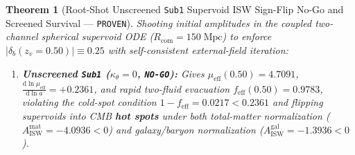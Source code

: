 \documentclass[11pt,a4paper]{article}
\newtheorem{theorem}{Theorem}
\begin{document}
\begin{theorem}[Root-Shot Unscreened \textnormal{{\upshape\texttt{Sub1}}} Supervoid ISW Sign-Flip No-Go and Screened Survival --- \textnormal{{\upshape\texttt{PROVEN}}}]
\label{thm:isw-nogo}
Shooting initial amplitudes in the coupled two-channel spherical supervoid ODE ($R_{\mathrm{com}} = 150\;\mathrm{Mpc}$) to enforce $|\delta_b(z_v = 0.50)| \equiv 0.25$ with self-consistent external-field iteration:
\begin{enumerate}
  \item \textbf{Unscreened {\upshape\texttt{Sub1}} ($\kappa_\theta = 0$, {\upshape\texttt{NO-GO}}):} Gives $\mu_{\mathrm{eff}}(0.50) = 4.7091$, $\frac{\mathrm{d}\ln\mu_{\mathrm{eff}}}{\mathrm{d}\ln a} = +0.2361$, and rapid two-fluid evacuation $f_{\mathrm{eff}}(0.50) = 0.9783$, violating the cold-spot condition $1 - f_{\mathrm{eff}} = 0.0217 < 0.2361$ and flipping supervoids into CMB \textbf{hot spots} under both total-matter normalization ($A_{\mathrm{ISW}}^{\mathrm{mat}} = \mathbf{-4.0936} < 0$) and galaxy/baryon normalization ($A_{\mathrm{ISW}}^{\mathrm{gal}} = \mathbf{-1.3936} < 0$).

\end{enumerate}
\end{theorem}
\end{document}
